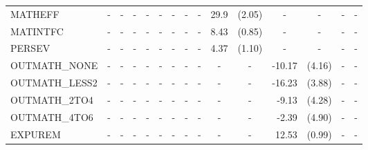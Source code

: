 \documentclass[10pt]{article}
\begin{document}
\begin{table}[htbp]
\begin{tabular}{lrlrlrlrlrlrlrl}
    MATHEFF & \multicolumn{1}{c}{-} & \multicolumn{1}{c}{-} & \multicolumn{1}{c}{-} & \multicolumn{1}{c}{-} & \multicolumn{1}{c}{-} & \multicolumn{1}{c}{-} & \multicolumn{1}{c}{-} & \multicolumn{1}{c}{-} & 29.9  & (2.05) & \multicolumn{1}{c}{-} & \multicolumn{1}{c}{-} & \multicolumn{1}{c}{-} & \multicolumn{1}{c}{-} \\
    MATINTFC & \multicolumn{1}{c}{-} & \multicolumn{1}{c}{-} & \multicolumn{1}{c}{-} & \multicolumn{1}{c}{-} & \multicolumn{1}{c}{-} & \multicolumn{1}{c}{-} & \multicolumn{1}{c}{-} & \multicolumn{1}{c}{-} & 8.43  & (0.85) & \multicolumn{1}{c}{-} & \multicolumn{1}{c}{-} & \multicolumn{1}{c}{-} & \multicolumn{1}{c}{-} \\
    PERSEV & \multicolumn{1}{c}{-} & \multicolumn{1}{c}{-} & \multicolumn{1}{c}{-} & \multicolumn{1}{c}{-} & \multicolumn{1}{c}{-} & \multicolumn{1}{c}{-} & \multicolumn{1}{c}{-} & \multicolumn{1}{c}{-} & 4.37  & (1.10) & \multicolumn{1}{c}{-} & \multicolumn{1}{c}{-} & \multicolumn{1}{c}{-} & \multicolumn{1}{c}{-} \\
    OUTMATH\_NONE & \multicolumn{1}{c}{-} & \multicolumn{1}{c}{-} & \multicolumn{1}{c}{-} & \multicolumn{1}{c}{-} & \multicolumn{1}{c}{-} & \multicolumn{1}{c}{-} & \multicolumn{1}{c}{-} & \multicolumn{1}{c}{-} & \multicolumn{1}{c}{-} & \multicolumn{1}{c}{-} & -10.17 & (4.16) & \multicolumn{1}{c}{-} & \multicolumn{1}{c}{-} \\
    OUTMATH\_LESS2 & \multicolumn{1}{c}{-} & \multicolumn{1}{c}{-} & \multicolumn{1}{c}{-} & \multicolumn{1}{c}{-} & \multicolumn{1}{c}{-} & \multicolumn{1}{c}{-} & \multicolumn{1}{c}{-} & \multicolumn{1}{c}{-} & \multicolumn{1}{c}{-} & \multicolumn{1}{c}{-} & -16.23 & (3.88) & \multicolumn{1}{c}{-} & \multicolumn{1}{c}{-} \\
    OUTMATH\_2TO4 & \multicolumn{1}{c}{-} & \multicolumn{1}{c}{-} & \multicolumn{1}{c}{-} & \multicolumn{1}{c}{-} & \multicolumn{1}{c}{-} & \multicolumn{1}{c}{-} & \multicolumn{1}{c}{-} & \multicolumn{1}{c}{-} & \multicolumn{1}{c}{-} & \multicolumn{1}{c}{-} & -9.13 & (4.28) & \multicolumn{1}{c}{-} & \multicolumn{1}{c}{-} \\
    OUTMATH\_4TO6 & \multicolumn{1}{c}{-} & \multicolumn{1}{c}{-} & \multicolumn{1}{c}{-} & \multicolumn{1}{c}{-} & \multicolumn{1}{c}{-} & \multicolumn{1}{c}{-} & \multicolumn{1}{c}{-} & \multicolumn{1}{c}{-} & \multicolumn{1}{c}{-} & \multicolumn{1}{c}{-} & -2.39 & (4.90) & \multicolumn{1}{c}{-} & \multicolumn{1}{c}{-} \\
    EXPUREM & \multicolumn{1}{c}{-} & \multicolumn{1}{c}{-} & \multicolumn{1}{c}{-} & \multicolumn{1}{c}{-} & \multicolumn{1}{c}{-} & \multicolumn{1}{c}{-} & \multicolumn{1}{c}{-} & \multicolumn{1}{c}{-} & \multicolumn{1}{c}{-} & \multicolumn{1}{c}{-} & 12.53 & (0.99) & \multicolumn{1}{c}{-} & \multicolumn{1}{c}{-} \\

\end{tabular}
\end{table}
\end{document}

